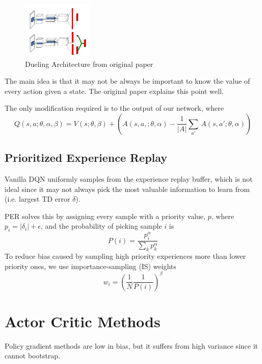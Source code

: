 \documentclass[12pt]{article} %
\begin{document}
\begin{figure}
  \begin{center}
    \includegraphics[width=0.3\textwidth]{images/duelingarch.png}
  \end{center}
  \caption{Dueling Architecture from original paper}
  \label{fig:duelingarch}
\end{figure}

The main idea is that it may not be always be important to know the value of every action given a state. The original paper explains this point well.

The only modification required is to the output of our network, where 
\begin{equation*}
    Q(s,a;\theta,\alpha,\beta) = V(s; \theta, \beta) + (A(s,a,;\theta,\alpha) - \frac{1}{|A|}\sum_{a'}\, A(s,a';\theta,\alpha))
\end{equation*}

\subsection{Prioritized Experience Replay}
Vanilla DQN uniformly samples from the experience replay buffer, which is not ideal since it may not always pick the most valuable information to learn from (i.e. largest TD error $\delta$).

PER solves this by assigning every sample with a priority value, $p$, where $p_i = |\delta_i| + \epsilon$, and the probability of picking sample $i$ is
\begin{equation*}
    P(i) = \frac{p_i^\alpha}{\sum_k p_k^\alpha}
\end{equation*}
To reduce bias caused by sampling high priority experiences more than lower priority ones, we use importance-sampling (IS) weights
\begin{equation*}
    w_i = (\frac{1}{N}\frac{1}{P(i)})^\beta
\end{equation*}
\section{Actor Critic Methods}
Policy gradient methods are low in bias, but it suffers from high variance since it cannot bootstrap.
\end{document}
